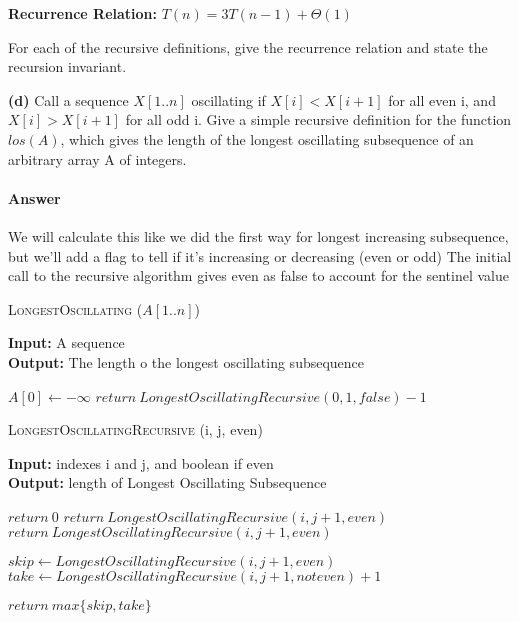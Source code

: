 \documentclass{article}
\begin{document}
{\bf Recurrence Relation: } $T(n) = 3T(n-1) + \Theta(1)$

\todo{}



For each of the recursive definitions, give the recurrence
relation and state the recursion invariant.

{\bf (d)} Call a sequence $X[1.. n]$ oscillating if $X[i] < X[i + 1]$ for all even i, and
$X[i] > X[i + 1]$ for all odd i. Give a simple recursive definition for
the function $los(A)$, which gives the length of the longest oscillating
subsequence of an arbitrary array A of integers.

\paragraph{Answer}

We will calculate this like we did the first way for longest increasing subsequence, but we'll add a
flag to tell if it's increasing or decreasing (even or odd)
The initial call to the recursive algorithm gives even as false to account for the sentinel value

\begin{algorithm} \caption{\textsc{LongestOscillating} ($A[1..n]$)}\label{alg:seb}
    {\bf Input:} A sequence\\
    {\bf Output:} The length o the longest oscillating subsequence
    \begin{algorithmic}[1]
        \State$A[0] \gets - \infty$
        \State$return\ LongestOscillatingRecursive(0, 1, false) -1$
    \end{algorithmic}
\end{algorithm}

\begin{algorithm} \caption{\textsc{LongestOscillatingRecursive} (i, j, even)}\label{alg:seb}
    {\bf Input:} indexes i and j, and boolean if even\\
    {\bf Output:} length of Longest Oscillating Subsequence
    \begin{algorithmic}[1]
            \State$return\ 0$
                \State$return\ LongestOscillatingRecursive(i, j+1, even)$
            \EndIf{}
        \Else{}
                \State$return\ LongestOscillatingRecursive(i, j+1, even)$
            \EndIf{}
        \EndIf{}

        \State$skip \gets LongestOscillatingRecursive(i, j+1, even)$
        \State$take \gets LongestOscillatingRecursive(i, j+1, not even) +1$

        \State$return\ max\{skip, take\}$
    \end{algorithmic}
\end{algorithm}
\end{document}
